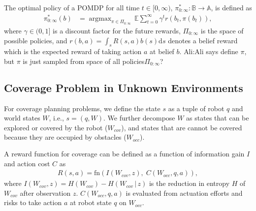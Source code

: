\documentclass[letterpaper]{article} %
\newcommand{\phdone}[1]{} %
\newcommand{\acomm}[1]{{\color{cyan}Ali:#1}} %
\newcommand{\argmax}{\mathop{\mathrm{argmax}}}
\begin{document}
\phdone{POMDP Objective function}
The optimal policy of a POMDP for all time $t \in [0,\infty)$, $\pi_{0:\infty}^* \! : \mathbb{B} \to \mathbb{A}$, is defined as
\begin{align}
  \pi_{0:\infty}^*(b) &= \argmax_{\pi \in \Pi_{0:\infty}} \, \mathbb{E} \sum_{t=0}^{\infty} \gamma^t r(b_t, \pi(b_t)),
  \label{eq:objective_function}
\end{align}
where $\gamma \in (0, 1]$ is a discount factor for the future rewards, $\Pi_{0:\infty}$ is the space of possible policies, and $r(b,a)=\int_s R(s,a)b(s)\mathrm{d}s$ denotes a belief reward which is the expected reward of taking action $a$ at belief $b$. \acomm{Ali says define $\pi$, but $\pi$ is just sampled from space of all policies$\Pi_{0:\infty}$?}


\subsection{Coverage Problem in Unknown Environments}

\phdone{Coverage Problem}
For coverage planning problems, we define the state $s$ as a tuple of robot $q$ and world states $W$, i.e., $s = (q, W)$.
We further decompose $W$ as states that can be explored or covered by the robot ($W_{cov}$), and states that are cannot be covered because they are occupied by obstacles ($W_{occ}$). %

A reward function for coverage can be defined as a function of information gain $I$ and action cost $C$ as
\begin{align}
  R(s, a) = \mathrm{fn}(I(W_{cov}, z),\; C(W_{occ}, q, a)),
  \label{eq:coverage_reward}
\end{align}
where $I(W_{cov}, z) = H(W_{cov}) - H(W_{cov} \,|\, z)$ is the reduction in entropy $H$ of $W_{cov}$ after observation $z$.  %
$C(W_{occ}, q, a)$ is evaluated from actuation efforts and risks to take action $a$ at robot state $q$ on $W_{occ}$.
\end{document}
